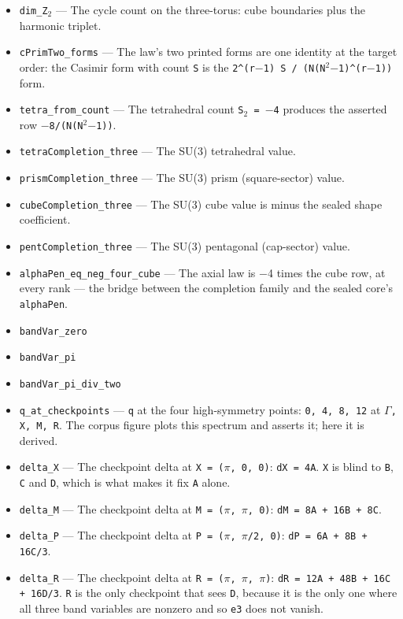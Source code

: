 \documentclass[11pt]{article}
\theoremstyle{plain}
\theoremstyle{definition}
\theoremstyle{remark}
\begin{document}
\begin{itemize}
\item \texttt{dim\_Z$_2$} --- The cycle count on the three-torus: cube boundaries plus the harmonic triplet.
\item \texttt{cPrimTwo\_forms} --- The law's two printed forms are one identity at the target order: the Casimir form with count \texttt{S} is the \texttt{2\^{}(r$-$1) S / (N(N$^2$$-$1)\^{}(r$-$1))} form.
\item \texttt{tetra\_from\_count} --- The tetrahedral count \texttt{S$_2$ = $-$4} produces the asserted row \texttt{$-$8/(N(N$^2$$-$1))}.
\item \texttt{tetraCompletion\_three} --- The SU(3) tetrahedral value.
\item \texttt{prismCompletion\_three} --- The SU(3) prism (square-sector) value.
\item \texttt{cubeCompletion\_three} --- The SU(3) cube value is minus the sealed shape coefficient.
\item \texttt{pentCompletion\_three} --- The SU(3) pentagonal (cap-sector) value.
\item \texttt{alphaPen\_eq\_neg\_four\_cube} --- The axial law is $-$4 times the cube row, at every rank --- the bridge between the completion family and the sealed core's \texttt{alphaPen}.
\item \texttt{bandVar\_zero}
\item \texttt{bandVar\_pi}
\item \texttt{bandVar\_pi\_div\_two}
\item \texttt{q\_at\_checkpoints} --- \texttt{q} at the four high-symmetry points: \texttt{0, 4, 8, 12} at \texttt{$\Gamma$, X, M, R}. The corpus figure plots this spectrum and asserts it; here it is derived.
\item \texttt{delta\_X} --- The checkpoint delta at \texttt{X = ($\pi$, 0, 0)}: \texttt{dX = 4A}. \texttt{X} is blind to \texttt{B}, \texttt{C} and \texttt{D}, which is what makes it fix \texttt{A} alone.
\item \texttt{delta\_M} --- The checkpoint delta at \texttt{M = ($\pi$, $\pi$, 0)}: \texttt{dM = 8A + 16B + 8C}.
\item \texttt{delta\_P} --- The checkpoint delta at \texttt{P = ($\pi$, $\pi$/2, 0)}: \texttt{dP = 6A + 8B + 16C/3}.
\item \texttt{delta\_R} --- The checkpoint delta at \texttt{R = ($\pi$, $\pi$, $\pi$)}: \texttt{dR = 12A + 48B + 16C + 16D/3}. \texttt{R} is the only checkpoint that sees \texttt{D}, because it is the only one where all three band variables are nonzero and so \texttt{e3} does not vanish.

\end{itemize}
\end{document}
